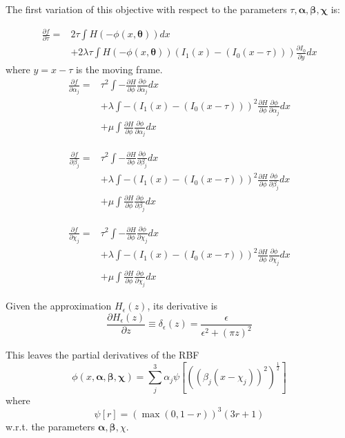 \documentclass[]{article}
\newcommand{\vect}[1]{\boldsymbol{#1}}
\begin{document}
The first variation of this objective with respect to the parameters
\(\tau, \vect{\alpha}, \vect{\beta}, \vect{\chi}\) is:

\begin{eqnarray*}
\frac{\partial f}{\partial \tau} = & 2\tau\int H(-\phi(x,\vect{\theta})) dx \\
& + 2\lambda\tau \int H(-\phi(x,\vect{\theta}))\left (I_1(x) - (I_0(x-\tau))
\right )\frac{\partial I_0}{\partial y} dx
\end{eqnarray*}
where \(y = x - \tau\) is the moving frame.
\begin{eqnarray*}
\frac{\partial f}{\partial \alpha_j} = & \tau^2\int -\frac{\partial
  H}{\partial \phi}\frac{\partial \phi}{\partial \alpha_j} dx \\
& + \lambda \int -\left (I_1(x) - (I_0(x-\tau)) \right )^2 \frac{\partial
  H}{\partial \phi}\frac{\partial \phi}{\partial \alpha_j} dx \\
& + \mu \int \frac{\partial
  H}{\partial \phi}\frac{\partial \phi}{\partial \alpha_j} dx
\end{eqnarray*}

\begin{eqnarray*}
\frac{\partial f}{\partial \beta_j} = & \tau^2\int -\frac{\partial
  H}{\partial \phi}\frac{\partial \phi}{\partial \beta_j} dx \\
&+ \lambda \int -\left (I_1(x) - (I_0(x-\tau)) \right )^2 \frac{\partial 
  H}{\partial \phi}\frac{\partial \phi}{\partial \beta_j} dx \\
& + \mu \int \frac{\partial
  H}{\partial \phi}\frac{\partial \phi}{\partial \beta_j} dx
\end{eqnarray*}

\begin{eqnarray*}
\frac{\partial f}{\partial \chi_j} = & \tau^2\int -\frac{\partial
  H}{\partial \phi}\frac{\partial \phi}{\partial \chi_j} dx \\
& + \lambda \int -\left (I_1(x) - (I_0(x-\tau)) \right )^2 \frac{\partial
  H}{\partial \phi}\frac{\partial \phi}{\partial \chi_j} dx \\
& + \mu \int \frac{\partial
  H}{\partial \phi}\frac{\partial \phi}{\partial \chi_j} dx
\end{eqnarray*}

\par
Given the approximation \(H_\epsilon(z)\), its derivative is
\begin{equation}
\frac{\partial H_\epsilon(z)}{\partial z} \equiv \delta_\epsilon(z) = 
\frac{\epsilon}{\epsilon^2 + (\pi z)^2}
\end{equation}
\par
This leaves the partial derivatives of the RBF 
\begin{equation}
\phi(x,\vect{\alpha},\vect{\beta},\vect{\chi}) = \sum_{j}^{3}\alpha_j \psi \left [
  ((\beta_j(x-\chi_j))^2)^{\frac{1}{2}} \right ]
\end{equation}
where
\begin{equation}
\psi[r] = \left ( \max{(0,1-r)} \right )^3(3r+1)
\end{equation}
w.r.t. the parameters \(\vect{\alpha}, \vect{\beta}, \chi\).
\end{document}
